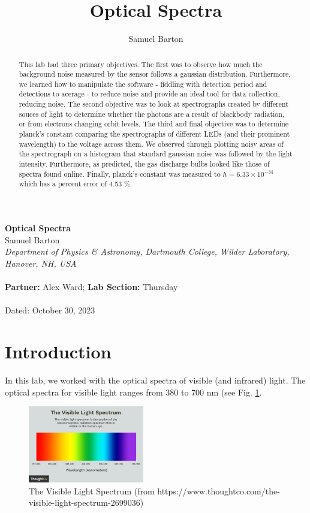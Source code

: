 \documentclass{article}[12pt]
\renewcommand{\figurename}{Fig. }
\begin{document}
\title{Optical Spectra}
\author{Samuel Barton}


\begin{center}
\large{\textbf{Optical Spectra}}\\
\bigskip
\small{Samuel Barton}\\
\small{\textit{Department of Physics \& Astronomy, Dartmouth College, Wilder Laboratory, Hanover, NH, USA}}\\
~\\
\small{\textbf{Partner:} Alex Ward; \textbf{Lab Section:} Thursday }\\
~\\
Dated: October 30, 2023\\

\end{center}

\bigskip
\begin{abstract}
  This lab had three primary objectives.
  The first was to observe how much the background noise measured by the sensor follows a gaussian distribution. Furthermore, we learned how to manipulate the software - fiddling with detection period and detections to acerage - to reduce noise and provide an ideal tool for data collection, reducing noise.
  The second objective was to look at spectrographs created by different souces of light to determine whether the photons are a result of blackbody radiation, or from electrons changing orbit levels.
  The third and final objective was to determine planck's constant comparing the spectrographs of different LEDs (and their prominent wavelength) to the voltage across them.
  We observed through plotting noisy areas of the spectrograph on a histogram that standard gaussian noise was followed by the light intensity.
  Furthermore, as predicted, the gas discharge bulbs looked like those of spectra found online.
  Finally, planck's constant was measured to $ h = 6.33 \times 10^{-34}  $ which has a percent error of 4.53 \%.
\end{abstract}
\bigskip

\section{Introduction}

In this lab, we worked with the optical spectra of visible (and infrared) light.
The optical spectra for visible light ranges from 380 to 700 nm (see \figurename \ref{vis_light}.

\begin{figure} [H]
  \centering
  \includegraphics[width=0.45\textwidth]{figures/visible_light_spectrum.png}
  \caption{The Visible Light Spectrum \tiny (from https://www.thoughtco.com/the-visible-light-spectrum-2699036)}
  \label{vis_light}
\end{figure}
\end{document}
